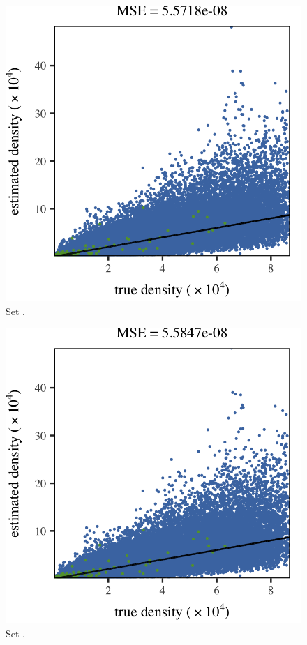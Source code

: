 \begin{subfigure}{0.3\textwidth}
	\centering
	\includegraphics[keepaspectratio=true, width=\textwidth, height=0.23\textheight]{result/img/results_baakman_5_60000_mbe_silverman}
	\caption{Set \baakmanFive, \mbe}
	\label{fig:results:singlesphere:mbe:baakman5}
\end{subfigure}
\begin{subfigure}{0.3\textwidth}
	\centering
	\includegraphics[keepaspectratio=true, width=\textwidth, height=0.23\textheight]{result/img/results_baakman_5_60000_sambe_silverman}
	\caption{Set \baakmanFive, \sambe}
	\label{fig:results:singlesphere:sambe:baakman5}
\end{subfigure}	